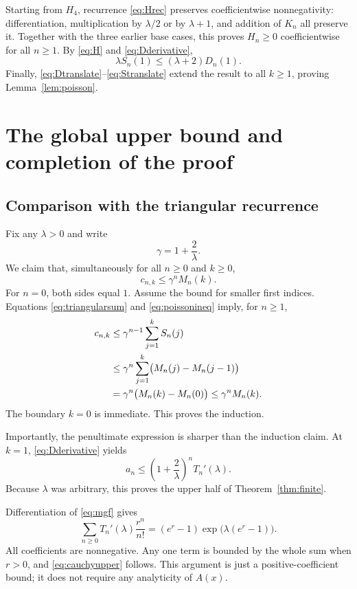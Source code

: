 \documentclass[11pt]{article}
\numberwithin{equation}{section}
\theoremstyle{remark}
\begin{document}
Starting from $H_4$, recurrence \eqref{eq:Hrec} preserves coefficientwise
nonnegativity: differentiation, multiplication by $\lambda/2$ or by
$\lambda+1$, and addition of $K_n$ all preserve it. Together with the
three earlier base cases, this proves $H_n\ge0$ coefficientwise for all
$n\ge1$. By \eqref{eq:H} and \eqref{eq:Dderivative},
\[
 \lambda S_n(1)\le(\lambda+2)D_n(1).
\]
Finally, \eqref{eq:Dtranslate}--\eqref{eq:Stranslate} extend the result to
all $k\ge1$, proving Lemma~\ref{lem:poisson}.

\section{The global upper bound and completion of the proof}

\subsection{Comparison with the triangular recurrence}

Fix any $\lambda>0$ and write
\[
 \gamma=1+\frac2\lambda.
\]
We claim that, simultaneously for all $n\ge0$ and $k\ge0$,
\begin{equation}\label{eq:majorant}
 c_{n,k}\le\gamma^n M_n(k).
\end{equation}
For $n=0$, both sides equal $1$. Assume the bound for smaller first
indices. Equations \eqref{eq:triangularsum} and \eqref{eq:poissonineq}
imply, for $n\ge1$,
\begin{align}
 c_{n,k}
 &\le\gamma^{n-1}\sum_{j=1}^k S_n(j)\notag\\
 &\le\gamma^n\sum_{j=1}^k\bigl(M_n(j)-M_n(j-1)\bigr)\notag\\
 &=\gamma^n\bigl(M_n(k)-M_n(0)\bigr)
 \le\gamma^n M_n(k).\label{eq:compareproof}
\end{align}
The boundary $k=0$ is immediate. This proves the induction.

Importantly, the penultimate expression is sharper than the induction
claim. At $k=1$, \eqref{eq:Dderivative} yields
\begin{equation}\label{eq:touchardupper}
 a_n\le\left(1+\frac2\lambda\right)^nT_n'(\lambda).
\end{equation}
Because $\lambda$ was arbitrary, this proves the upper half of
Theorem~\ref{thm:finite}.

Differentiation of \eqref{eq:mgf} gives
\[
 \sum_{n\ge0}T_n'(\lambda)\frac{r^n}{n!}
 =(e^r-1)\exp\!\bigl(\lambda(e^r-1)\bigr).
\]
All coefficients are nonnegative. Any one term is bounded by the whole
sum when $r>0$, and \eqref{eq:cauchyupper} follows. This argument is just
a positive-coefficient bound; it does not require any analyticity of
$A(x)$.
\end{document}
